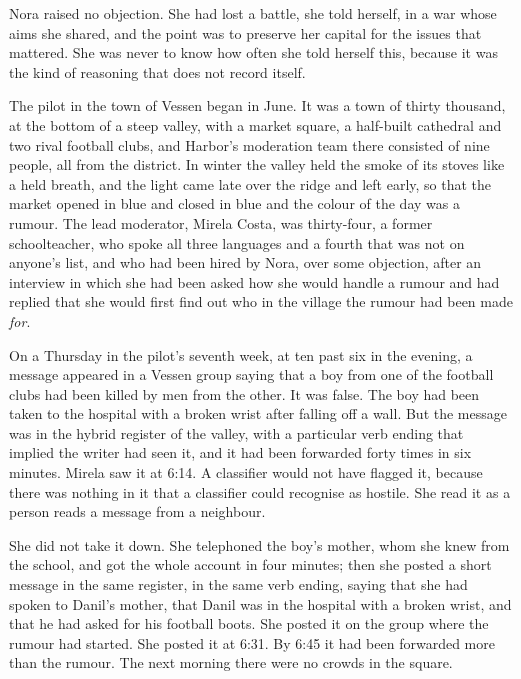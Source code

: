 Nora raised no objection. She had lost a battle, she told herself, in a war whose aims she shared, and the point was to preserve her capital for the issues that mattered. She was never to know how often she told herself this, because it was the kind of reasoning that does not record itself.

The pilot in the town of Vessen began in June. It was a town of thirty thousand, at the bottom of a steep valley, with a market square, a half-built cathedral and two rival football clubs, and Harbor's moderation team there consisted of nine people, all from the district. In winter the valley held the smoke of its stoves like a held breath, and the light came late over the ridge and left early, so that the market opened in blue and closed in blue and the colour of the day was a rumour. The lead moderator, Mirela Costa, was thirty-four, a former schoolteacher, who spoke all three languages and a fourth that was not on anyone's list, and who had been hired by Nora, over some objection, after an interview in which she had been asked how she would handle a rumour and had replied that she would first find out who in the village the rumour had been made \emph{for}.

On a Thursday in the pilot's seventh week, at ten past six in the evening, a message appeared in a Vessen group saying that a boy from one of the football clubs had been killed by men from the other. It was false. The boy had been taken to the hospital with a broken wrist after falling off a wall. But the message was in the hybrid register of the valley, with a particular verb ending that implied the writer had seen it, and it had been forwarded forty times in six minutes. Mirela saw it at 6:14. A classifier would not have flagged it, because there was nothing in it that a classifier could recognise as hostile. She read it as a person reads a message from a neighbour.

She did not take it down. She telephoned the boy's mother, whom she knew from the school, and got the whole account in four minutes; then she posted a short message in the same register, in the same verb ending, saying that she had spoken to Danil's mother, that Danil was in the hospital with a broken wrist, and that he had asked for his football boots. She posted it on the group where the rumour had started. She posted it at 6:31. By 6:45 it had been forwarded more than the rumour. The next morning there were no crowds in the square.

